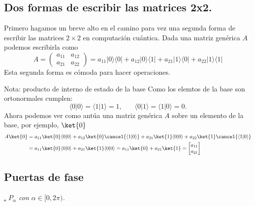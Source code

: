 \documentclass[a4paper,11pt]{book} %
\numberwithin{equation}{chapter}
\def\lp{\left(}
\def\rp{\right)}
\newcommand{\braket}[2]{\langle #1|#2\rangle}
\newcommand{\ketbra}[2]{| #1\rangle \! \langle #2|}
\def\subsubiContadorIt{\par\addtocounter{subsubsection}{1}\underline{\it\thesubsubsection.}\hskip0.5cm \setcounter{subsubsubsectionIt}{0}}
\newcommand{\SubsubiIt}[1]{
		\subsubiContadorIt \textit{#1}
	}
\newcounter{subsubsubsectionIt}[subsubsection]
\begin{document}
		\subsection{Dos formas de escribir las matrices 2x2.}   

Primero hagamos un breve alto en el camino para vez una segunda forma de escribir las matrices $2\times2$ en computación cuántica. Dada una matriz genérica $A$ podemos escribirla como
\begin{equation}
A = \lp \begin{matrix}
a_{11} & a_{12} \\
a_{21} & a_{22}
\end{matrix} \rp = 
a_{11} \ketbra{0}{0} + a_{12} \ketbra{0}{1} +  a_{21} \ketbra{1}{0} +  a_{22} \ketbra{1}{1} 
\end{equation}
Esta segunda forma es cómoda para hacer operaciones. 

	\begin{mybox_blue}{Nota: producto de interno de estado de la base}
	Como los elemtos de la base son ortonormales cumplen:
	\begin{equation}
	\braket{0}{0} = \braket{1}{1} = 1, ~~~~~~~~ \braket{0}{1}=\braket{1}{0}=0.
	\end{equation}
	Ahora podemos ver como antúa una matriz genérica $A$ sobre un elemento de la base, por ejemplo, $\ket{0}$
	\begin{align*}
	A \ket{0} & = a_{11} \ket{0}\braket{0}{0} + a_{12} \ket{0} \cancel{\braket{1}{0}} +  
		a_{21} \ket{1}\braket{0}{0} +  a_{22} \ket{1} \cancel{\braket{1}{0}} \\
	& = a_{11} \ket{0}\braket{0}{0} + a_{21} \ket{1}\braket{0}{0} = a_{11} \ket{0} + a_{21}\ket{1} =
	\begin{bmatrix} a_{11} \\ a_{21} \end{bmatrix}
	\end{align*}
	

	\end{mybox_blue}
	
        \subsection{Puertas de fase} 
		    \SubsubiIt{$P_\alpha$ con $\alpha \in [ 0, 2\pi ) $.}
\end{document}
